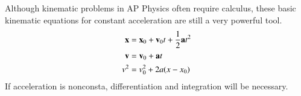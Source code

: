 \documentclass[11pt]{article}
\newcommand{\mb}[1]{\ensuremath\mathbf{#1}}
\begin{document}
Although kinematic problems in AP Physics often require calculus, these basic
kinematic equations for constant acceleration are still a very powerful tool.
%
\begin{align*}
  \mb{x} &= \mb{x}_0+ \mb{v}_0t + \frac{1}{2}\mb{a}t^2\\
  \mb{v} &=\mb{v}_0+\mb{a}t\\
  v^2 &= v_0^2+ 2a(x-x_0)
\end{align*}
%    
%
%
If acceleration is nonconsta, differentiation and integration will be necessary.
%
%
%  
%
\end{document}
